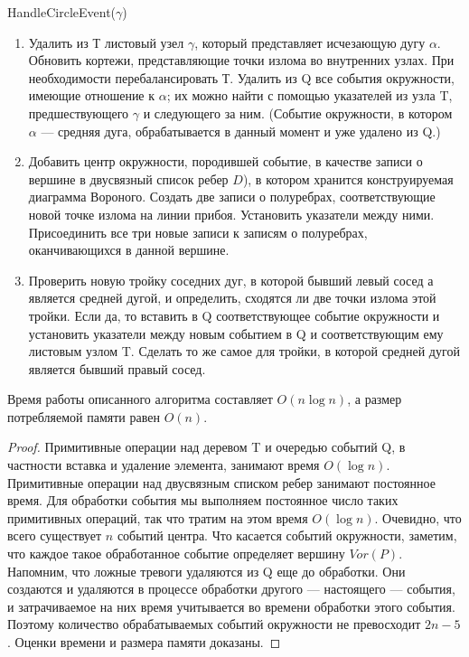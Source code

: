 HandleCircleEvent($\gamma$)

\begin{enumerate}
	\item 	 Удалить  из  Т  листовый  узел  $\gamma$,  который  представляет  исчезающую  дугу  $\alpha$.
	Обновить  кортежи,  представляющие  точки  излома  во  внутренних  узлах.
	При необходимости  перебалансировать  Т.
	Удалить  из  Q  все  события  окружности, имеющие  отношение  к $\alpha$;  их  можно  найти  с  помощью  указателей  из  узла  T, предшествующего $\gamma$ и  следующего  за  ним.  
	(Событие  окружности,  в  котором $\alpha$ --- средняя  дуга,  обрабатывается  в  данный  момент  и  уже  удалено  из  Q.)
	\item 	 Добавить  центр  окружности,  породившей  событие,  в  качестве  записи  о  вершине  в  двусвязный  список  ребер  $D$),  в  котором  хранится  конструируемая  диаграмма  Вороного.
	Создать  две  записи  о  полуребрах,  соответствующие  новой  точке излома  на  линии  прибоя.
	Установить  указатели  между  ними. 
	Присоединить все  три  новые  записи  к  записям  о  полуребрах,  оканчивающихся  в  данной  вершине.
	\item 	 Проверить  новую  тройку  соседних  дуг,  в  которой  бывший  левый  сосед  а  является  средней  дугой,  и  определить,  сходятся  ли  две  точки  излома  этой  тройки. 
	Если  да,  то  вставить  в  Q  соответствующее  событие  окружности  и  установить указатели  между  новым  событием  в  Q  и  соответствующим  ему  листовым  узлом  T.
	Сделать  то  же  самое  для  тройки,  в  которой  средней  дугой  является  бывший  правый  сосед.
\end{enumerate}

\begin{lemma}
	Время  работы  описанного  алгоритма  составляет  $O(n \log n)$,  а  размер  потребляемой  памяти  равен $O(n)$.
\end{lemma}
\begin{proof}
	Примитивные  операции  над  деревом T и  очередью  событий  Q, в  частности  вставка  и  удаление  элемента,  занимают  время  $O(\log n)$.
	Примитивные операции  над  двусвязным  списком  ребер  занимают  постоянное  время.
	Для  обработки  события  мы  выполняем  постоянное  число  таких  примитивных  операций, так  что  тратим  на  этом  время $O(\log n)$.
	Очевидно,  что  всего  существует  $n$  событий центра.
	Что  касается  событий  окружности,  заметим,  что  каждое  такое  обработанное  событие  определяет  вершину  $Vor(P)$.
	Напомним,  что  ложные  тревоги  удаляются  из  Q  еще  до  обработки.
	Они  создаются  и  удаляются  в  процессе  обработки другого --- настоящего --- события,  и  затрачиваемое  на  них  время  учитывается  во времени  обработки  этого  события.  
	Поэтому  количество  обрабатываемых  событий окружности  не  превосходит $2n - 5$.
	Оценки  времени  и  размера  памяти  доказаны.
\end{proof}